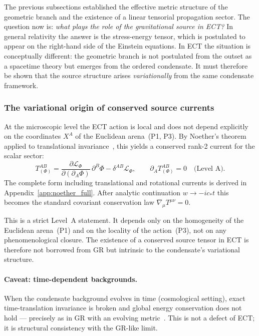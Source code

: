 \documentclass[11pt,a4paper]{article}
\numberwithin{equation}{section}
\begin{document}
\medskip
The previous subsections established the effective metric structure of
the geometric branch and the existence of a linear tensorial propagation
sector.
The question now is: \emph{what plays the role of the gravitational
source in ECT?}
In general relativity the answer is the stress-energy tensor, which is
postulated to appear on the right-hand side of the Einstein equations.
In ECT the situation is conceptually different: the geometric branch is
not postulated from the outset as a spacetime theory but emerges from
the ordered condensate.
It must therefore be shown that the source structure arises
\emph{variationally} from the same condensate framework.

\subsubsection*{The variational origin of conserved source currents}

At the microscopic level the ECT action is local and does not depend
explicitly on the coordinates $X^A$ of the Euclidean arena~(P1, P3).
By Noether's theorem applied to translational invariance~\cite{Noether1918},
this yields a conserved rank-2 current for the scalar sector:
\begin{equation}
  \label{eq:Tab_Phi}
  T^{AB}_{(\Phi)}
  = \frac{\partial\mathcal{L}_\Phi}{\partial(\partial_A\Phi)}\,
    \partial^B\Phi - \delta^{AB}\mathcal{L}_\Phi,
  \qquad
  \partial_A T^{AB}_{(\Phi)} = 0
  \quad\text{(Level~A)}.
\end{equation}
The complete form including translational and rotational currents
is derived in Appendix~\ref{app:noether_full}.
After analytic continuation $w\to-ic_*t$ this becomes the standard
covariant conservation law $\nabla_\mu T^{\mu\nu}=0$.

This is a strict Level~A statement.
It depends only on the homogeneity of the Euclidean arena~(P1) and on
the locality of the action~(P3), not on any phenomenological closure.
The existence of a conserved source tensor in ECT is therefore not
borrowed from GR but intrinsic to the condensate's variational structure.

\paragraph{Caveat: time-dependent backgrounds.}
When the condensate background evolves in time (cosmological setting),
exact time-translation invariance is broken and global energy
conservation does not hold --- precisely as in GR with an evolving
metric~\cite{Weinberg1972}.
This is not a defect of ECT; it is structural consistency with the
GR-like limit.
\end{document}
